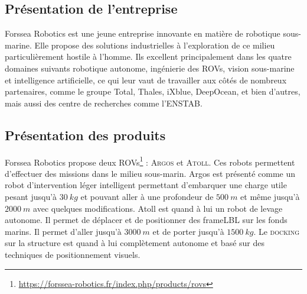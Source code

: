 \subsection{Présentation de l'entreprise}
    Forssea Robotics est une jeune entreprise innovante en matière de robotique sous-marine. Elle propose des solutions industrielles à l'exploration de ce milieu particulièrement hostile à l'homme. Ils excellent principalement dans les quatre domaines suivants robotique autonome, ingénierie des \gls{ROV}s, vision sous-marine et intelligence artificielle, ce qui leur vaut de travailler aux côtés de nombreux partenaires, comme le groupe Total, Thales, iXblue, DeepOcean, et bien d'autres, mais aussi des centre de recherches comme l'\gls{ENSTAB}.

\subsection{Présentation des produits}
    Forssea Robotics propose deux \gls{ROV}s\footnote{\url{https://forssea-robotics.fr/index.php/products/rovs}} : \textsc{Argos} et \textsc{Atoll}. Ces robots permettent d'effectuer des missions dans le milieu sous-marin. \gls{Argos} est présenté comme un robot d'intervention léger intelligent permettant d'embarquer une charge utile pesant jusqu'à $30\ kg$ et pouvant aller à une profondeur de $500\ m$ et même jusqu'à $2000\ m$ avec quelques modifications. \gls{Atoll} est quand à lui un robot de levage autonome. Il permet de déplacer et de positionner des \gls{frameLBL} sur les fonds marins. Il permet d'aller jusqu'à $3000\ m$ et de porter jusqu'à $1500\ kg$. Le \textsc{docking} sur la structure est quand à lui complètement autonome et basé sur des techniques de positionnement visuels.

